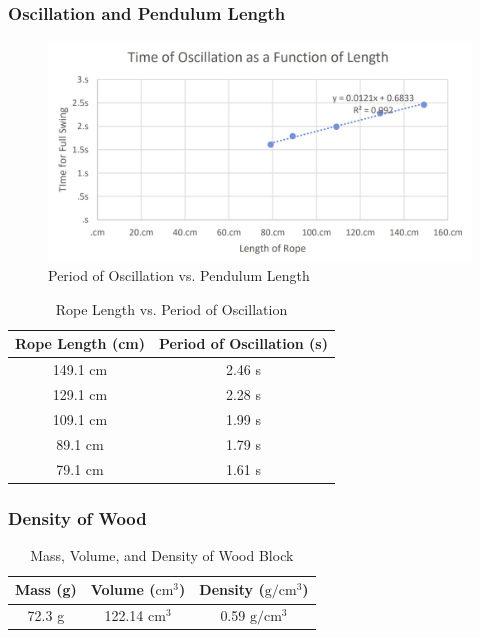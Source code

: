 \documentclass{article}
\begin{document}
\subsubsection{Oscillation and Pendulum Length}
\begin{figure}[H]
    \caption{Period of Oscillation vs. Pendulum Length}
    \label{plot:2}
    \includegraphics[width=16cm]{lab1_plot3.png}
\end{figure}

\begin{table}[H]
\caption{Rope Length vs. Period of Oscillation}\vspace{0.5em}
\label{tab:2}
\centering
\begin{tabular}{|c|c|}
    \hline
    \rowcolor{black}
    \color{white} Rope Length (cm) & \color{white} Period of Oscillation (s) \\
    \hline
    149.1 cm & 2.46 s \\
    \hline
    129.1 cm & 2.28 s \\
    \hline
    109.1 cm & 1.99 s \\
    \hline
    89.1 cm  & 1.79 s \\
    \hline
    79.1 cm  & 1.61 s \\

    \hline
\end{tabular} 
\end{table}

\subsubsection{Density of Wood}
\begin{table}[H]
\caption{Mass, Volume, and Density of Wood Block}\vspace{0.5em}
\label{tab:3}
\centering
\begin{tabular}{|c|c|c|}
    \hline
    \rowcolor{black}
    \color{white} Mass (g) & \color{white} Volume ($\mathrm{cm}^3$) & \color{white} Density ($\mathrm{g}/\mathrm{cm}^3$) \\
    \hline
    72.3 g & 122.14 $\mathrm{cm}^3$ & 0.59 $\mathrm{g}/\mathrm{cm}^3$ \\

    \hline
\end{tabular} 
\end{table}
\end{document}
